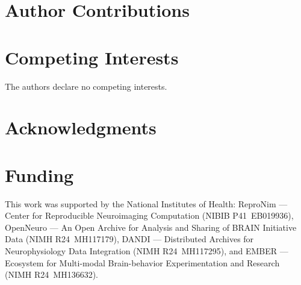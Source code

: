 \documentclass{article}
\begin{document}

\section{Author Contributions}

\section{Competing Interests}
The authors declare no competing interests.

\section{Acknowledgments}

\section{Funding}
This work was supported by the National Institutes of Health:
ReproNim --- Center for Reproducible Neuroimaging Computation (NIBIB P41~EB019936),
OpenNeuro --- An Open Archive for Analysis and Sharing of BRAIN Initiative Data (NIMH R24~MH117179),
DANDI --- Distributed Archives for Neurophysiology Data Integration (NIMH R24~MH117295),
and EMBER --- Ecosystem for Multi-modal Brain-behavior Experimentation and Research (NIMH R24~MH136632).
\end{document}
